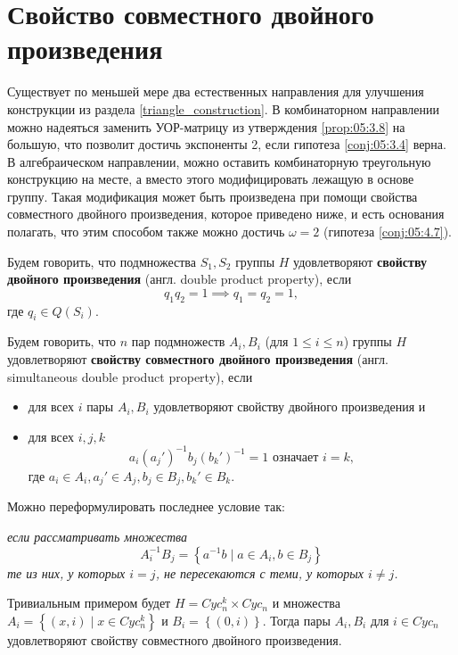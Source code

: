 \section{Свойство совместного двойного произведения}

Существует по меньшей мере два естественных направления для улучшения конструкции из раздела \ref{triangle_construction}. В комбинаторном направлении можно надеяться заменить УОР-матрицу из утверждения \ref{prop:05:3.8} на большую, что позволит достичь экспоненты 2, если гипотеза \ref{conj:05:3.4} верна. В алгебраическом направлении, можно оставить комбинаторную треугольную конструкцию на месте, а вместо этого модифицировать лежащую в основе группу. Такая модификация может быть произведена при помощи свойства совместного двойного произведения, которое приведено ниже, и есть основания полагать, что этим способом также можно достичь $\omega=2$ (гипотеза \ref{conj:05:4.7}).

\begin{definition}
 Будем говорить, что подмножества $S_1, S_2$ группы $H$ удовлетворяют \textbf{свойству двойного произведения} (англ. double product property), если
 \[
 	q_1 q_2 = 1 \implies q_1 = q_2 = 1,
 \]  
 где $q_i \in Q(S_i)$.
\end{definition}

\begin{definition}\label{def:05:4.1}
  Будем говорить, что $n$ пар подмножеств $A_i, B_i$ (для $1 \leq i \leq n$) группы $H$ удовлетворяют \textbf{свойству совместного двойного произведения} (англ. simultaneous double product property), если
  \begin{itemize}
    \item для всех $i$ пары $A_i, B_i$ удовлетворяют свойству двойного произведения и 
    \item для всех $i,j,k$ 
    \[
    	a_i (a_j')^{-1} b_j (b_k')^{-1} = 1 \text{ означает } i=k,
    \]
    где $a_i \in A_i, a_j' \in A_j, b_j \in B_j, b_k' \in B_k$.
  \end{itemize}
\end{definition}

Можно переформулировать последнее условие так: 

\textit{если рассматривать множества
\[
	A_i^{-1} B_j = \left\{ a^{-1}b \mid a \in A_i, b \in B_j \right\}
\]
те из них, у которых $i=j$, не пересекаются с теми, у которых $i \neq j$.}

Тривиальным примером будет $H = Cyc_n^k \times Cyc_n$ и множества $A_i = \left\{ (x,i) \mid x \in Cyc_n^k \right\}$ и $B_i = \left\{ (0,i) \right\}$. Тогда пары $A_i, B_i$ для $i \in Cyc_n$ удовлетворяют свойству совместного двойного произведения.

